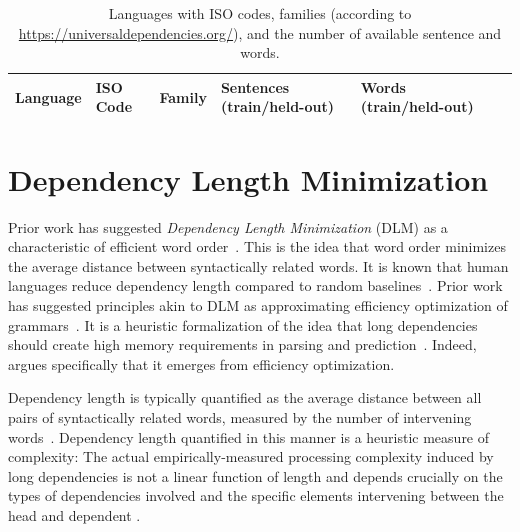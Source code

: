 \documentclass[10pt,twoside,lineno]{article}
\begin{document}
\begin{table}[ht]
\small{
\begin{tabular}{lllllll}
Language & ISO Code & Family & Sentences (train/held-out) & Words (train/held-out) \\ \hline

\end{tabular}
}
\caption{Languages with ISO codes, families (according to \url{https://universaldependencies.org/}), and the number of available sentence and words.}\label{tab:langs-iso-sizes}
\end{table}



\section{Dependency Length Minimization}\label{sec:DLM}



Prior work has suggested \emph{Dependency Length Minimization} (DLM) as a characteristic of efficient word order~\cite{futrell2015largescale,liu2017dependency,temperley2018minimizing}.
This is the idea that word order minimizes the average distance between syntactically related words.
It is known that human languages reduce dependency length compared to random baselines~\cite{futrell2015largescale,liu2017dependency,temperley2018minimizing}.
Prior work has suggested principles akin to DLM as approximating efficiency optimization of grammars~\cite{hawkins1994performance,hawkins2004efficiency,futrell2017memory, futrell2017generalizing}.
It is a heuristic formalization of the idea that long dependencies should create high memory requirements in parsing and prediction~\cite{hawkins1994performance,gibson1998linguistic,gibson2000dependency, futrell2017memory}.
Indeed, \cite{futrell2017memory} argues specifically that it emerges from efficiency optimization.

Dependency length is typically quantified as the average distance between all pairs of syntactically related words, measured by the number of intervening words~\cite{futrell2015largescale}.
Dependency length quantified in this manner is a heuristic measure of complexity:
The actual empirically-measured processing complexity induced by long dependencies is not a linear function of length and depends crucially on the types of dependencies involved \cite{demberg2008data} and the specific elements intervening between the head and dependent \cite{gibson1998linguistic,gibson2000dependency,lewis2005activationbased}.
\end{document}
